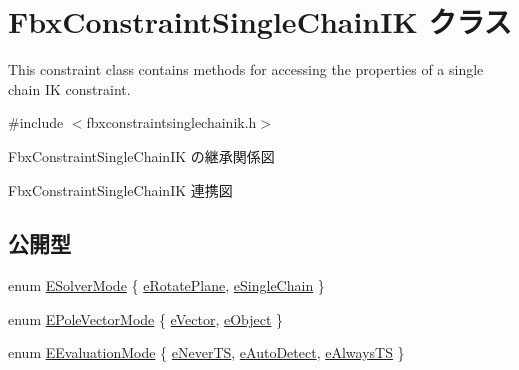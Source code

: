 \hypertarget{class_fbx_constraint_single_chain_i_k}{}\section{Fbx\+Constraint\+Single\+Chain\+IK クラス}
\label{class_fbx_constraint_single_chain_i_k}


This constraint class contains methods for accessing the properties of a single chain IK constraint.  




{\ttfamily \#include $<$fbxconstraintsinglechainik.\+h$>$}



Fbx\+Constraint\+Single\+Chain\+IK の継承関係図


Fbx\+Constraint\+Single\+Chain\+IK 連携図
\subsection*{公開型}
\begin{DoxyCompactItemize}
\item 
enum \hyperlink{class_fbx_constraint_single_chain_i_k_aac22215f25edcd32ca36e0e4ec0c1d9a}{E\+Solver\+Mode} \{ \hyperlink{class_fbx_constraint_single_chain_i_k_aac22215f25edcd32ca36e0e4ec0c1d9aa50550478223ad7fa82d857c7f5cd8160}{e\+Rotate\+Plane}, 
\hyperlink{class_fbx_constraint_single_chain_i_k_aac22215f25edcd32ca36e0e4ec0c1d9aa1fa1389075eefdd86c267eab6880a7ca}{e\+Single\+Chain}
 \}
\item 
enum \hyperlink{class_fbx_constraint_single_chain_i_k_a853dee195ab92c878a805ed7206a93bb}{E\+Pole\+Vector\+Mode} \{ \hyperlink{class_fbx_constraint_single_chain_i_k_a853dee195ab92c878a805ed7206a93bba1c3f447e03df20c501c61a098e162420}{e\+Vector}, 
\hyperlink{class_fbx_constraint_single_chain_i_k_a853dee195ab92c878a805ed7206a93bbac0d1970fc811997b6248e11efbdf31bc}{e\+Object}
 \}
\item 
enum \hyperlink{class_fbx_constraint_single_chain_i_k_aa730475e0c3f9f1ecc04e61f39369fc1}{E\+Evaluation\+Mode} \{ \hyperlink{class_fbx_constraint_single_chain_i_k_aa730475e0c3f9f1ecc04e61f39369fc1a92ece36c1a7245ce49d98f355ed78c5f}{e\+Never\+TS}, 
\hyperlink{class_fbx_constraint_single_chain_i_k_aa730475e0c3f9f1ecc04e61f39369fc1a2d85bdf9a9c48132894a0b3d35b6c1b2}{e\+Auto\+Detect}, 
\hyperlink{class_fbx_constraint_single_chain_i_k_aa730475e0c3f9f1ecc04e61f39369fc1ab6a348da5218082487a30df63cee3c5d}{e\+Always\+TS}
 \}
\end{DoxyCompactItemize}
